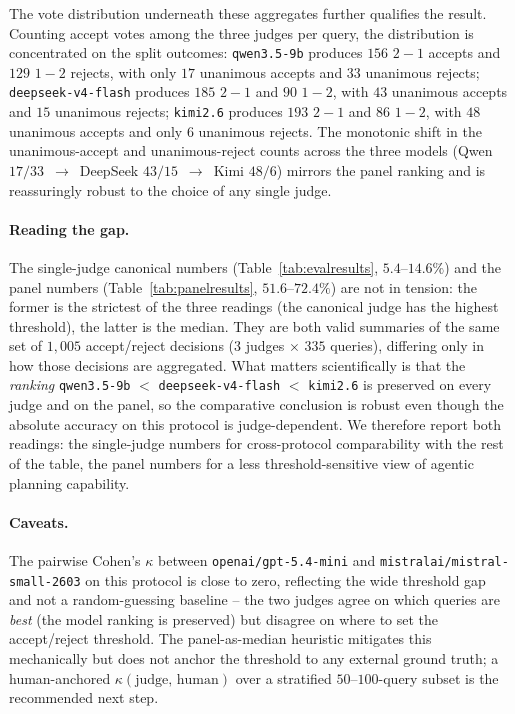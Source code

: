 \documentclass[11pt,a4paper]{article}
\begin{document}
The vote distribution underneath these aggregates further qualifies the
result. Counting accept votes among the three judges per query, the
distribution is concentrated on the split outcomes:
\texttt{qwen3.5-9b} produces $156$ $2{-}1$ accepts and $129$ $1{-}2$
rejects, with only $17$ unanimous accepts and $33$ unanimous rejects;
\texttt{deepseek-v4-flash} produces $185$ $2{-}1$ and $90$ $1{-}2$, with
$43$ unanimous accepts and $15$ unanimous rejects; \texttt{kimi2.6}
produces $193$ $2{-}1$ and $86$ $1{-}2$, with $48$ unanimous accepts and
only $6$ unanimous rejects. The monotonic shift in the unanimous-accept and
unanimous-reject counts across the three models (Qwen
$17/33$~$\to$~DeepSeek $43/15$~$\to$~Kimi $48/6$) mirrors the panel ranking
and is reassuringly robust to the choice of any single judge.

\paragraph{Reading the gap.} The single-judge canonical numbers
(Table~\ref{tab:evalresults}, $5.4$--$14.6\%$) and the panel numbers
(Table~\ref{tab:panelresults}, $51.6$--$72.4\%$) are not in tension: the
former is the strictest of the three readings (the canonical judge has the
highest threshold), the latter is the median. They are both valid summaries
of the same set of $1{,}005$ accept/reject decisions ($3$ judges $\times$
$335$ queries), differing only in how those decisions are aggregated. What
matters scientifically is that the \emph{ranking} \texttt{qwen3.5-9b} $<$
\texttt{deepseek-v4-flash} $<$ \texttt{kimi2.6} is preserved on every
judge and on the panel, so the comparative conclusion is robust even though
the absolute accuracy on this protocol is judge-dependent. We therefore
report both readings: the single-judge numbers for cross-protocol
comparability with the rest of the table, the panel numbers for a less
threshold-sensitive view of agentic planning capability.

\paragraph{Caveats.} The pairwise Cohen's $\kappa$ between
\texttt{openai/gpt-5.4-mini} and \texttt{mistralai/mistral-small-2603} on
this protocol is close to zero, reflecting the wide threshold gap and not a
random-guessing baseline -- the two judges agree on which queries are
\emph{best} (the model ranking is preserved) but disagree on where to set
the accept/reject threshold. The panel-as-median heuristic mitigates this
mechanically but does not anchor the threshold to any external ground truth;
a human-anchored $\kappa(\text{judge, human})$ over a stratified
$50$--$100$-query subset is the recommended next step.
\end{document}

